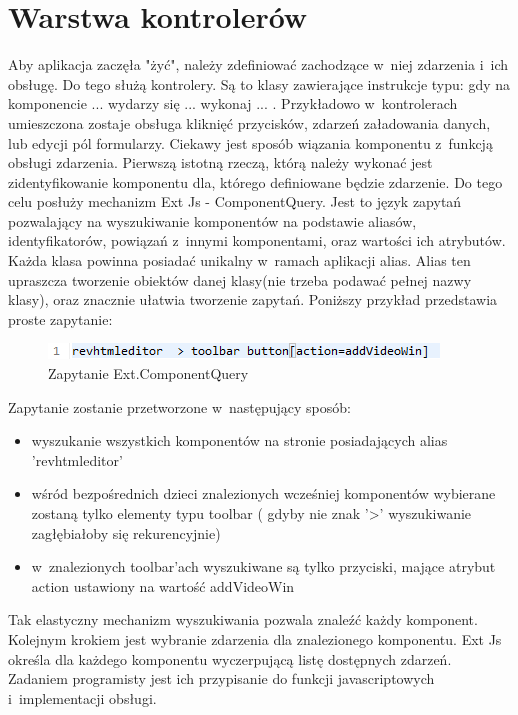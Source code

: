\section{Warstwa kontrolerów}

Aby aplikacja zaczęła "żyć", należy zdefiniować zachodzące w~niej zdarzenia i~ich obsługę. Do tego służą kontrolery. Są to klasy zawierające instrukcje typu: gdy na komponencie ... wydarzy się ... wykonaj ... . Przykładowo w~kontrolerach umieszczona zostaje obsługa kliknięć przycisków, zdarzeń załadowania danych, lub edycji pól formularzy. Ciekawy jest sposób wiązania komponentu z~funkcją obsługi zdarzenia. Pierwszą istotną rzeczą, którą należy wykonać jest zidentyfikowanie komponentu dla, którego definiowane będzie zdarzenie. Do tego celu posłuży mechanizm Ext Js - ComponentQuery. Jest to język zapytań pozwalający na wyszukiwanie komponentów na podstawie aliasów, identyfikatorów, powiązań z~innymi komponentami, oraz wartości ich atrybutów. Każda klasa powinna posiadać unikalny w~ramach aplikacji alias. Alias ten upraszcza tworzenie obiektów danej klasy(nie trzeba podawać pełnej nazwy klasy), oraz znacznie ułatwia tworzenie zapytań. Poniższy przykład przedstawia proste zapytanie: 

\begin{figure}[H]
	\centering
	\includegraphics[width=\textwidth]{images/cmp_query.png}
	\caption{Zapytanie Ext.ComponentQuery}
\end{figure}

Zapytanie zostanie przetworzone w~następujący sposób:

\begin{itemize}
\item wyszukanie wszystkich komponentów na stronie posiadających alias 'revhtmleditor'
\item wśród bezpośrednich dzieci znalezionych wcześniej komponentów wybierane zostaną tylko elementy typu toolbar ( gdyby nie znak '>' wyszukiwanie zagłębiałoby się rekurencyjnie)
\item w~znalezionych toolbar'ach wyszukiwane są tylko przyciski, mające atrybut action ustawiony na wartość addVideoWin
\end{itemize}

Tak elastyczny mechanizm wyszukiwania pozwala znaleźć każdy komponent.
Kolejnym krokiem jest wybranie zdarzenia dla znalezionego komponentu. Ext Js określa dla każdego komponentu wyczerpującą listę dostępnych zdarzeń. Zadaniem programisty jest ich przypisanie do funkcji javascriptowych i~implementacji obsługi.

